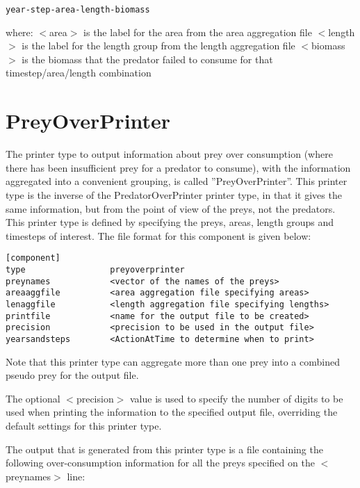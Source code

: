\documentclass[10pt,twoside]{book}
\begin{document}
{\small\begin{verbatim}
year-step-area-length-biomass
\end{verbatim}}

where:\newline
$<$area$>$ is the label for the area from the area aggregation file\newline
$<$length$>$ is the label for the length group from the length aggregation file\newline
$<$biomass$>$ is the biomass that the predator failed to consume for that timestep/area/length combination

\section{PreyOverPrinter}\label{sec:preyoverprinter}
The printer type to output information about prey over consumption (where there has been insufficient prey for a predator to consume), with the information aggregated into a convenient grouping, is called ''PreyOverPrinter''.  This printer type is the inverse of the PredatorOverPrinter printer type, in that it gives the same information, but from the point of view of the preys, not the predators.  This printer type is defined by specifying the preys, areas, length groups and timesteps of interest.  The file format for this component is given below:

{\small\begin{verbatim}
[component]
type                 preyoverprinter
preynames            <vector of the names of the preys>
areaaggfile          <area aggregation file specifying areas>
lenaggfile           <length aggregation file specifying lengths>
printfile            <name for the output file to be created>
precision            <precision to be used in the output file>
yearsandsteps        <ActionAtTime to determine when to print>
\end{verbatim}}

Note that this printer type can aggregate more than one prey into a combined pseudo prey for the output file.

\bigskip
The optional $<$precision$>$ value is used to specify the number of digits to be used when printing the information to the specified output file, overriding the default settings for this printer type.

\bigskip
The output that is generated from this printer type is a file containing the following over-consumption information for all the preys specified on the $<$preynames$>$ line:
\end{document}
